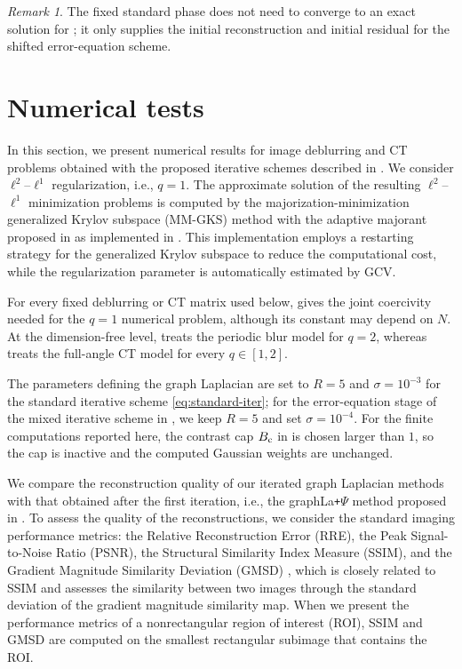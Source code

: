 \documentclass{article}
\theoremstyle{remark}
\newtheorem{remark}[theorem]{Remark}
\begin{document}
\begin{remark}
The fixed standard phase does not need to converge to an exact solution for
; it only supplies the initial reconstruction
and initial residual for the shifted error-equation scheme. 
\end{remark}

\section{Numerical tests}\label{sec:numerical_results}

In this section, we present numerical results for image deblurring and CT problems
obtained with the proposed iterative schemes described in .
We consider $\ell^2$--$\ell^1$ regularization, i.e., $q=1$. The approximate solution of the resulting $\ell^2$--$\ell^1$ minimization problems is computed by the majorization-minimization generalized Krylov subspace (MM-GKS) method with the adaptive majorant proposed in \cite{LMRS15} as implemented in \cite{buccini2024software}.
This implementation employs a restarting strategy for the generalized Krylov subspace to reduce the computational cost, while the regularization parameter is automatically estimated by GCV.



For every fixed deblurring or CT matrix used below,
 gives the joint coercivity needed for the
$q=1$ numerical problem, although its constant may depend on $N$. At the
dimension-free level,  treats the periodic blur
model for $q=2$, whereas  treats the full-angle CT model
for every $q\in[1,2]$.


The parameters defining the graph Laplacian are set to $R=5$ and $\sigma=10^{-3}$ for the standard iterative scheme \cref{eq:standard-iter}; for the error-equation stage of the mixed iterative scheme in , we keep $R=5$ and set $\sigma=10^{-4}$.
For the finite computations reported here, the contrast cap $B_{\rm c}$ in  is chosen larger
than $1$, so the cap
is inactive and the computed Gaussian weights are unchanged. 


We compare the reconstruction quality of our iterated graph Laplacian methods with that obtained after the first iteration, i.e., the graphLa\texttt{+}$\Psi$ method proposed in \cite{bianchi2025data}.
To assess the quality of the reconstructions, we consider the standard imaging performance metrics: the Relative Reconstruction Error (RRE), the Peak Signal-to-Noise Ratio (PSNR), the Structural Similarity Index Measure (SSIM), and the Gradient Magnitude Similarity Deviation (GMSD) \cite{Xue2014-wt}, which is closely related to SSIM and assesses the similarity between two images through the standard deviation of the gradient magnitude similarity map.
When we present the performance metrics of a nonrectangular region of interest (ROI), SSIM and GMSD are computed on the smallest rectangular subimage that contains the ROI.
\end{document}
